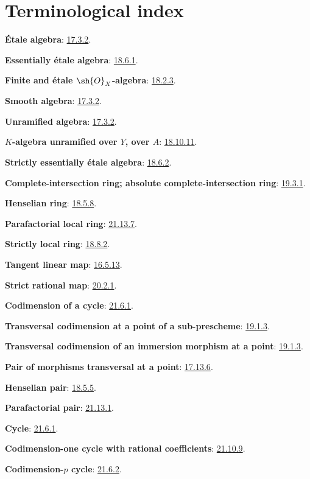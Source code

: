 \clearpage
{}
{}
\section*{Terminological index}

\begingroup
\small
\setlength{\parindent}{0pt}
\setlength{\parskip}{2pt}
\newcommand{\EGAIVterm}[2]{\textbf{#1}: #2.\par}
\newcommand{\EGAIVidxref}[1]{\hyperref[IV.#1]{#1}}

\EGAIVterm{\'Etale algebra}{{\hyperlink{ega4.c04.subsec.17-3-2}{17.3.2}}}
\EGAIVterm{Essentially \'etale algebra}{{\hyperlink{ega4.c04.statement.18-6-1}{18.6.1}}}
\EGAIVterm{Finite and \'etale $\sh{O}_X$-algebra}{{\hyperlink{ega4.c04.prop.18-2-3}{18.2.3}}}
\EGAIVterm{Smooth algebra}{{\hyperlink{ega4.c04.subsec.17-3-2}{17.3.2}}}
\EGAIVterm{Unramified algebra}{{\hyperlink{ega4.c04.subsec.17-3-2}{17.3.2}}}
\EGAIVterm{$K$-algebra unramified over $Y$, over $A$}{{\hyperlink{ega4.c04.rem.18-10-11}{18.10.11}}}
\EGAIVterm{Strictly essentially \'etale algebra}{{\hyperlink{ega4.c04.lem.18-6-2}{18.6.2}}}
\EGAIVterm{Complete-intersection ring; absolute complete-intersection ring}{{\hyperlink{ega4.c04.def.19-3-1}{19.3.1}}}
\EGAIVterm{Henselian ring}{{\hyperlink{ega4.c04.def.18-5-8}{18.5.8}}}
\EGAIVterm{Parafactorial local ring}{{\hyperlink{ega4.c04.def.21-13-7}{21.13.7}}}
\EGAIVterm{Strictly local ring}{{\hyperlink{ega4.c04.def.18-8-2}{18.8.2}}}
\EGAIVterm{Tangent linear map}{{\hyperlink{ega4.c04.statement.16-5-13}{16.5.13}}}
\EGAIVterm{Strict rational map}{{\hyperlink{ega4.c04.statement.20-2-1}{20.2.1}}}
\EGAIVterm{Codimension of a cycle}{{\hyperlink{ega4.c04.statement.21-6-1}{21.6.1}}}
\EGAIVterm{Transversal codimension at a point of a sub-prescheme}{{\hyperlink{ega4.c04.def.19-1-3}{19.1.3}}}
\EGAIVterm{Transversal codimension of an immersion morphism at a point}{{\hyperlink{ega4.c04.def.19-1-3}{19.1.3}}}
\EGAIVterm{Pair of morphisms transversal at a point}{{\hyperlink{ega4.c04.cor.17-13-6}{17.13.6}}}
\EGAIVterm{Henselian pair}{{\hyperlink{ega4.c04.def.18-5-5}{18.5.5}}}
\EGAIVterm{Parafactorial pair}{{\hyperlink{ega4.c04.def.21-13-1}{21.13.1}}}
\EGAIVterm{Cycle}{{\hyperlink{ega4.c04.statement.21-6-1}{21.6.1}}}
\EGAIVterm{Codimension-one cycle with rational coefficients}{{\hyperlink{ega4.c04.statement.21-10-9}{21.10.9}}}
\EGAIVterm{Codimension-$p$ cycle}{{\hyperlink{ega4.c04.statement.21-6-2}{21.6.2}}}
